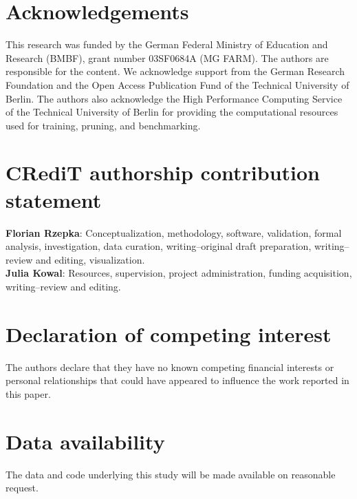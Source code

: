 \documentclass[review]{elsarticle}
\begin{document}
\section*{Acknowledgements}
This research was funded by the German Federal Ministry of Education and Research (BMBF), grant number 03SF0684A (MG FARM). The authors are responsible for the content. We acknowledge support from the German Research Foundation and the Open Access Publication Fund of the Technical University of Berlin. The authors also acknowledge the High Performance Computing Service of the Technical University of Berlin for providing the computational resources used for training, pruning, and benchmarking.

\section*{CRediT authorship contribution statement}
\textbf{Florian Rzepka}: Conceptualization, methodology, software, validation, formal analysis, investigation, data curation, writing--original draft preparation, writing--review and editing, visualization.\\
\textbf{Julia Kowal}: Resources, supervision, project administration, funding acquisition, writing--review and editing.

\section*{Declaration of competing interest}
The authors declare that they have no known competing financial interests or personal relationships that could have appeared to influence the work reported in this paper.

\section*{Data availability}
The data and code underlying this study will be made available on reasonable request.
\end{document}
